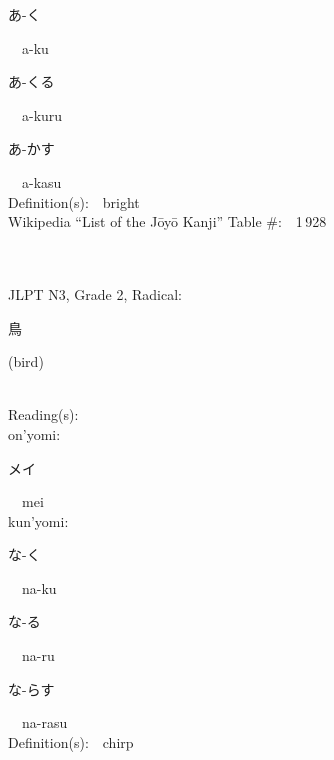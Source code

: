 \begin{multicols}{2}
{\hspace*{2em}}{\begin{CJK}{UTF8}{min} あ-く \end{CJK}}\ \ a-ku\ \ \\
{\hspace*{2em}}{\begin{CJK}{UTF8}{min} あ-くる \end{CJK}}\ \ a-kuru\ \ \\
{\hspace*{2em}}{\begin{CJK}{UTF8}{min} あ-かす \end{CJK}}\ \ a-kasu\ \ \\
Definition(s):\ \ bright \\
Wikipedia ``List of the J\=oy\=o Kanji'' Table \#:\ \ 1\,928 \\
\ \ \\
{\fontsize{34pt}{40pt}  }\ \ \\  %
{JLPT N3, Grade 2, Radical:\ \ {\begin{CJK}{UTF8}{min} 鳥 \end{CJK}} (bird) } \\
Reading(s):\ \ \\
{\hspace*{1em}}on'yomi:\ \ \\
{\hspace*{2em}}{\begin{CJK}{UTF8}{min} メイ \end{CJK}}\ \ mei\ \ \\
{\hspace*{1em}}kun'yomi:\ \ \\
{\hspace*{2em}}{\begin{CJK}{UTF8}{min} な-く \end{CJK}}\ \ na-ku\ \ \\
{\hspace*{2em}}{\begin{CJK}{UTF8}{min} な-る \end{CJK}}\ \ na-ru\ \ \\
{\hspace*{2em}}{\begin{CJK}{UTF8}{min} な-らす \end{CJK}}\ \ na-rasu\ \ \\
Definition(s):\ \ chirp \\

\end{multicols}
